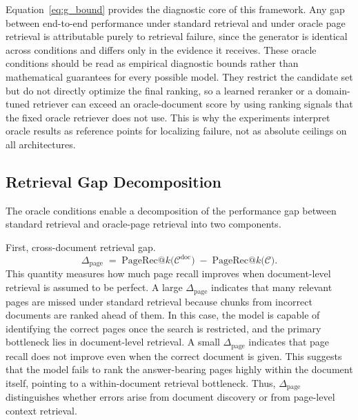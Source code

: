 \documentclass[12pt,twoside,maitrise]{dms}
\theoremstyle{definition}
\numberwithin{equation}{section}
\numberwithin{table}{chapter}
\numberwithin{figure}{chapter}
\begin{document}
Equation~\eqref{eq:g_bound} provides the diagnostic core of this framework.  Any gap
between end-to-end performance under standard retrieval and under oracle page retrieval
is attributable purely to retrieval failure, since the generator is identical across
conditions and differs only in the evidence it receives.  These oracle conditions should
be read as empirical diagnostic bounds rather than mathematical guarantees for every
possible model. They restrict the candidate set but do not directly optimize the final
ranking, so a learned reranker or a domain-tuned retriever can exceed an
oracle-document score by using ranking signals that the fixed oracle retriever does not
use. This is why the experiments interpret oracle results as reference points for
localizing failure, not as absolute ceilings on all architectures.

\subsection{Retrieval Gap Decomposition}
\label{sec:oracle_gaps}

The oracle conditions enable a decomposition of the performance gap between standard retrieval and oracle-page retrieval into two components.

First, cross-document retrieval gap.
\begin{equation}
  \Delta_{\mathrm{page}}
    \;=\;
  \mathrm{PageRec@}k\!\bigl(\mathcal{C}^{\mathrm{doc}}\bigr)
    \;-\;
  \mathrm{PageRec@}k\!\bigl(\mathcal{C}\bigr).
  \label{eq:delta_page}
\end{equation}
This quantity measures how much page recall improves when document-level retrieval is assumed to be perfect. A large $\Delta_{\mathrm{page}}$ indicates that many relevant pages are missed under standard retrieval because chunks from incorrect documents are ranked ahead of them. In this case, the model is capable of identifying the correct pages once the search is restricted, and the primary bottleneck lies in document-level retrieval. A small $\Delta_{\mathrm{page}}$ indicates that page recall does not improve even when the correct document is given. This suggests that the model fails to rank the answer-bearing pages highly within the document itself, pointing to a within-document retrieval bottleneck. Thus, $\Delta_{\mathrm{page}}$ distinguishes whether errors arise from document discovery or from page-level context retrieval.
\end{document}
